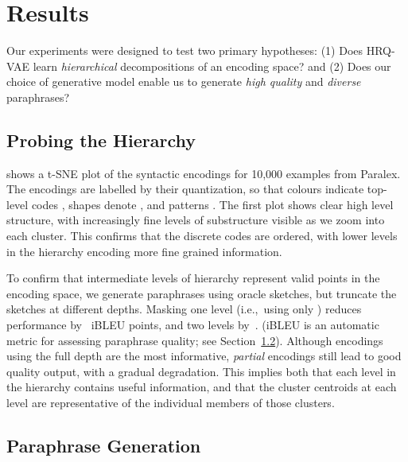 \documentclass[11pt]{article}
\begin{document}
\section{Results}

Our experiments were designed to test two primary hypotheses: (1) Does HRQ-VAE learn \textit{hierarchical} decompositions of an encoding space? and (2) Does our choice of generative model enable us to generate\textit{ high quality} and \textit{diverse} paraphrases? 



\subsection{Probing the Hierarchy}
\label{sec:probing-hierarchy}

 shows a t-SNE \cite{tsne} plot of the syntactic encodings  for 10,000 examples from Paralex. The encodings are labelled by their quantization, so that colours indicate top-level codes , shapes denote , and patterns . The first plot shows clear high level structure, with increasingly fine levels of substructure visible as we zoom into each cluster. This confirms that the discrete codes are ordered, with lower levels in the hierarchy encoding more fine grained information. 

To confirm that intermediate levels of hierarchy represent valid
points in the encoding space, we generate paraphrases using oracle
sketches, but truncate the sketches at different depths. Masking one level (i.e.,~using only ) reduces performance by~ iBLEU points,
and two levels by~. (iBLEU is an automatic metric for assessing
paraphrase quality; see Section~\ref{sec:paraphr-gener}). Although
encodings using the full depth are the most informative,
\textit{partial} encodings
still lead to good quality output, with a gradual degradation. This implies both that each level
in the hierarchy contains useful information, and that the cluster
centroids at each level are representative of the individual members
of those clusters.









\subsection{Paraphrase Generation}
\label{sec:paraphr-gener}
\end{document}

